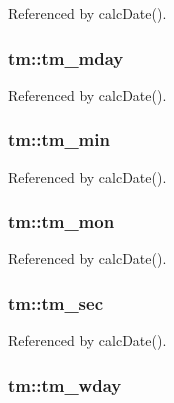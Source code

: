 Referenced by calc\-Date().

\hypertarget{structtm_a55163a11263b30f96b72f5a3bd675cb5}{
\subsubsection[{tm\-\_\-mday}]{ tm\-::tm\-\_\-mday}}\label{structtm_a55163a11263b30f96b72f5a3bd675cb5}


Referenced by calc\-Date().

\hypertarget{structtm_a8795928685a8da0df53de0cfa1cb1a51}{
\subsubsection[{tm\-\_\-min}]{ tm\-::tm\-\_\-min}}\label{structtm_a8795928685a8da0df53de0cfa1cb1a51}


Referenced by calc\-Date().

\hypertarget{structtm_a8a9735a7cbfe839de5e48eeb1beb559e}{
\subsubsection[{tm\-\_\-mon}]{ tm\-::tm\-\_\-mon}}\label{structtm_a8a9735a7cbfe839de5e48eeb1beb559e}


Referenced by calc\-Date().

\hypertarget{structtm_ad138117367ca2d1aa1b50dff4306cad3}{
\subsubsection[{tm\-\_\-sec}]{ tm\-::tm\-\_\-sec}}\label{structtm_ad138117367ca2d1aa1b50dff4306cad3}


Referenced by calc\-Date().

\hypertarget{structtm_a9f8125ef8eba5bc564156f954c215efe}{
\subsubsection[{tm\-\_\-wday}]{ tm\-::tm\-\_\-wday}}\label{structtm_a9f8125ef8eba5bc564156f954c215efe}


